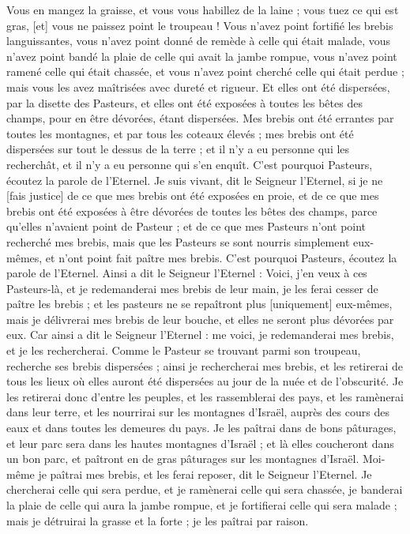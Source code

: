 \begin{multicols}{2}
Vous en mangez la graisse, et vous vous habillez de la laine ; vous tuez ce qui est gras, [et] vous ne paissez point le troupeau !
Vous n'avez point fortifié les brebis languissantes, vous n'avez point donné de remède à celle qui était malade, vous n'avez point bandé la plaie de celle qui avait la jambe rompue, vous n'avez point ramené celle qui était chassée, et vous n'avez point cherché celle qui était perdue ; mais vous les avez maîtrisées avec dureté et rigueur.
Et elles ont été dispersées, par la disette des Pasteurs, et elles ont été exposées à toutes les bêtes des champs, pour en être dévorées, étant dispersées.
Mes brebis ont été errantes par toutes les montagnes, et par tous les coteaux élevés ; mes brebis ont été dispersées sur tout le dessus de la terre ; et il n'y a eu personne qui les recherchât, et il n'y a eu personne qui s'en enquît.
C'est pourquoi Pasteurs, écoutez la parole de l'Eternel.
Je suis vivant, dit le Seigneur l'Eternel, si je ne [fais justice] de ce que mes brebis ont été exposées en proie, et de ce que mes brebis ont été exposées à être dévorées de toutes les bêtes des champs, parce qu'elles n'avaient point de Pasteur ; et de ce que mes Pasteurs n'ont point recherché mes brebis, mais que les Pasteurs se sont nourris simplement eux-mêmes, et n'ont point fait paître mes brebis.
C'est pourquoi Pasteurs, écoutez la parole de l'Eternel.
Ainsi a dit le Seigneur l'Eternel : Voici, j'en veux à ces Pasteurs-là, et je redemanderai mes brebis de leur main, je les ferai cesser de paître les brebis ; et les pasteurs ne se repaîtront plus [uniquement] eux-mêmes, mais je délivrerai mes brebis de leur bouche, et elles ne seront plus dévorées par eux.
Car ainsi a dit le Seigneur l'Eternel : me voici, je redemanderai mes brebis, et je les rechercherai.
Comme le Pasteur se trouvant parmi son troupeau, recherche ses brebis dispersées ; ainsi je rechercherai mes brebis, et les retirerai de tous les lieux où elles auront été dispersées au jour de la nuée et de l'obscurité.
Je les retirerai donc d'entre les peuples, et les rassemblerai des pays, et les ramènerai dans leur terre, et les nourrirai sur les montagnes d'Israël, auprès des cours des eaux et dans toutes les demeures du pays.
Je les paîtrai dans de bons pâturages, et leur parc sera dans les hautes montagnes d'Israël ; et là elles coucheront dans un bon parc, et paîtront en de gras pâturages sur les montagnes d'Israël.
Moi-même je paîtrai mes brebis, et les ferai reposer, dit le Seigneur l'Eternel.
Je chercherai celle qui sera perdue, et je ramènerai celle qui sera chassée, je banderai la plaie de celle qui aura la jambe rompue, et je fortifierai celle qui sera malade ; mais je détruirai la grasse et la forte ; je les paîtrai par raison.

\end{multicols}
